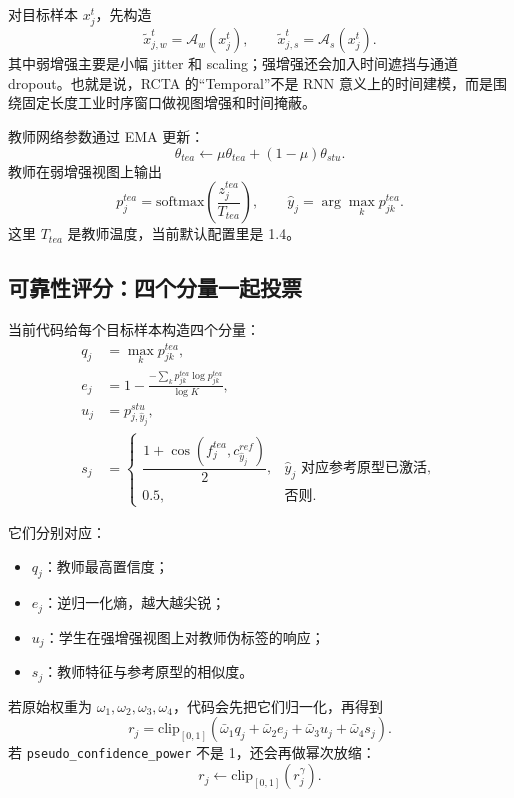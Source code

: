 \documentclass[12pt,a4paper]{ctexart}
\newcommand{\softmax}{\mathrm{softmax}}
\begin{document}
对目标样本 $x_j^t$，先构造
\begin{equation}
\tilde x_{j,w}^t=\mathcal{A}_w(x_j^t),\qquad
\tilde x_{j,s}^t=\mathcal{A}_s(x_j^t).
\end{equation}
其中弱增强主要是小幅 jitter 和 scaling；强增强还会加入时间遮挡与通道 dropout。也就是说，RCTA 的“Temporal”不是 RNN 意义上的时间建模，而是围绕固定长度工业时序窗口做视图增强和时间掩蔽。

教师网络参数通过 EMA 更新：
\begin{equation}
\theta_{tea}\leftarrow
\mu\theta_{tea}+(1-\mu)\theta_{stu}.
\end{equation}
教师在弱增强视图上输出
\begin{equation}
p_j^{tea}
=
\softmax\left(\frac{z_j^{tea}}{T_{tea}}\right),
\qquad
\hat y_j=\arg\max_k p_{jk}^{tea}.
\end{equation}
这里 $T_{tea}$ 是教师温度，当前默认配置里是 1.4。

\subsection{可靠性评分：四个分量一起投票}

当前代码给每个目标样本构造四个分量：
\begin{align}
q_j &= \max_k p_{jk}^{tea},\\
e_j &= 1-\frac{-\sum_k p_{jk}^{tea}\log p_{jk}^{tea}}{\log K},\\
u_j &= p_{j,\hat y_j}^{stu},\\
s_j &=
\begin{cases}
\dfrac{1+\cos(f_j^{tea},c_{\hat y_j}^{ref})}{2}, & \hat y_j \text{ 对应参考原型已激活},\\[6pt]
0.5, & \text{否则}.
\end{cases}
\end{align}

它们分别对应：
\begin{itemize}[leftmargin=2em]
  \item $q_j$：教师最高置信度；
  \item $e_j$：逆归一化熵，越大越尖锐；
  \item $u_j$：学生在强增强视图上对教师伪标签的响应；
  \item $s_j$：教师特征与参考原型的相似度。
\end{itemize}

若原始权重为 $\omega_1,\omega_2,\omega_3,\omega_4$，代码会先把它们归一化，再得到
\begin{equation}
r_j
=
\mathrm{clip}_{[0,1]}
\left(
\bar\omega_1 q_j+\bar\omega_2 e_j+\bar\omega_3 u_j+\bar\omega_4 s_j
\right).
\end{equation}
若 \texttt{pseudo\_confidence\_power} 不是 1，还会再做幂次放缩：
\begin{equation}
r_j \leftarrow \mathrm{clip}_{[0,1]}(r_j^\gamma).
\end{equation}
\end{document}
